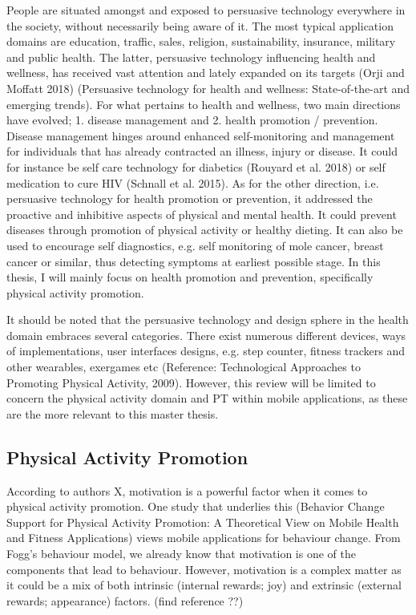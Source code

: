 People are situated amongst and exposed to persuasive technology everywhere in the society, without necessarily being aware of it. The most typical application domains are education, traffic, sales, religion, sustainability, insurance, military and public health. The latter, persuasive technology influencing health and wellness, has received vast attention and lately expanded on its targets (Orji and Moffatt 2018) (Persuasive technology for health and wellness: State-of-the-art and emerging trends). For what pertains to health and wellness, two main directions have evolved; 1. disease management and 2. health promotion / prevention. Disease management hinges around enhanced self-monitoring and management for individuals that has already contracted an illness, injury or disease. It could for instance be self care technology for diabetics (Rouyard et al. 2018) or self medication to cure HIV (Schnall et al. 2015). As for the other direction, i.e. persuasive technology for health promotion or prevention, it addressed the proactive and inhibitive aspects of physical and mental health. It could prevent diseases through promotion of physical activity or healthy dieting. It can also be used to encourage self diagnostics, e.g. self monitoring of mole cancer, breast cancer or similar, thus detecting symptoms at earliest  possible stage. In this thesis, I will mainly focus on health promotion and prevention, specifically physical activity promotion. 

It should be noted that the persuasive technology and design sphere in the health domain embraces several categories. There exist numerous different devices, ways of implementations, user interfaces designs, e.g. step counter, fitness trackers and other wearables, exergames etc (Reference: Technological Approaches to Promoting Physical Activity, 2009). However, this review will be limited to concern the physical activity domain and PT within mobile applications, as these are the more relevant to this master thesis. 

\subsection{Physical Activity Promotion}
According to authors X, motivation is a powerful factor when it comes to physical activity promotion. One study that underlies this (Behavior Change Support for Physical Activity Promotion: A Theoretical View on Mobile Health and Fitness Applications) views mobile applications for behaviour change. From Fogg's behaviour model, we already know that motivation is one of the components that lead to behaviour. However, motivation is a complex matter as it could be a mix of both intrinsic (internal rewards; joy) and extrinsic (external rewards; appearance) factors. (find reference ??)

